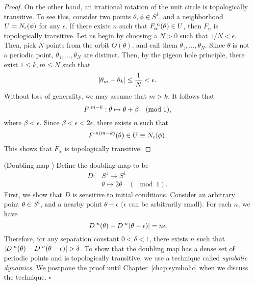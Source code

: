 \documentclass[10pt,draft,twoside]{book}
\begin{document}
\begin{example}
\begin{proposition}
\begin{proof}
      On the other hand, an irrational rotation of the unit circle is topologically transitive.
      To see this, consider two points $\theta, \phi \in S^1$, and a neighborhood $U = N_{\epsilon}(\phi)$ for any $\epsilon$.
      If there exists $n$ such that $F_\alpha^{\;n}(\theta) \in U$, then $F_\alpha$ is topologically transitive.
      Let us begin by choosing a $N > 0$ such that $1/N < \epsilon$.
      Then, pick $N$ points from the orbit $O(\theta)$, and call them $\theta_1, \ldots, \theta_N$.
      Since $\theta$ is not a periodic point, $\theta_1, \ldots, \theta_N$ are distinct.
      Then, by the pigeon hole principle, there exist $1 \leq k,m \leq N$ such that
      \begin{equation*}
        \left |  \theta_m - \theta_k  \right | \leq \frac{1}{N} < \epsilon.
      \end{equation*}
      Without loss of generality, we may assume that $m > k$.
      It follows that 
      \begin{equation*}
        F^{\;m - k}: \theta \mapsto \theta + \beta \quad(\mathrm{mod}\; \mathrm{1}),
      \end{equation*}
      where $\beta < \epsilon$.
      Since $\beta < \epsilon < 2\epsilon$, there exists $n$ such that
      \begin{equation*}
        F^{\;n(m-k)}(\theta) \in U \equiv N_{\epsilon}(\phi).
      \end{equation*}
      This shows that $F_\alpha$ is topologically transitive.
    \end{proof}
  \end{proposition}
\end{example}
\begin{example}
  (Doubling map \citep{devaney})
  Define the doubling map to be 
  \begin{align*}
    D: &S^1 \to S^1  \\
    &\theta \mapsto 2\theta \quad(\mod{1}).
  \end{align*}
  First, we show that $D$ is sensitive to initial conditions. 
  Consider an arbitrary point $\theta \in S^1$, and a nearby point $\theta - \epsilon$ ($\epsilon$ can be arbitrarily small).
  For each $n$, we have
  \begin{equation*}
    \left |  D^{\;n}(\theta) - D^{\;n}(\theta - \epsilon)  \right | 
    = 
    n\epsilon.
  \end{equation*}
  Therefore, for any separation constant $0 < \delta < 1$, there exists $n$ such that $\left |  D^{\;n}(\theta) - D^{\;n}(\theta - \epsilon)  \right | > \delta$.
  To show that the doubling map has a dense set of periodic points and is topologically transitive, we use a technique called \textit{symbolic dynamics}.
  We postpone the proof until Chapter~\ref{chap:symbolic} when we discuss the technique.
  $\square$
\end{example}
\end{document}
